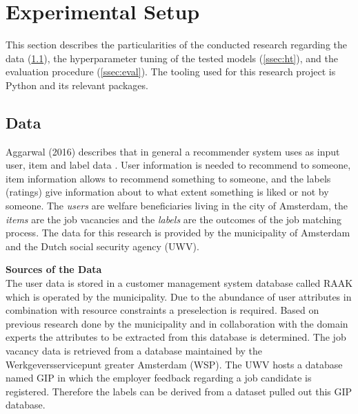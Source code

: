 \section{Experimental Setup}
\label{sec:setup}
This section describes the particularities of the conducted research regarding the data (\ref{ssec:data}), the hyperparameter tuning of the tested models (\ref{ssec:ht}), and the evaluation procedure (\ref{ssec:eval}). 
The tooling used for this research project is Python and its relevant packages.

\subsection{Data}
\label{ssec:data}
Aggarwal (2016) describes that in general a recommender system uses as input user, item and label data \cite{aggarwal2016recommender}.
User information is needed to recommend to someone, item information allows to recommend something to someone, and the labels (ratings) give information about to what extent  something is liked or not by someone.
The \textit{users} are welfare beneficiaries living in the city of Amsterdam, the \textit{items} are the job vacancies and the \textit{labels} are the outcomes of the job matching process.
The data for this research is provided by the municipality of Amsterdam and the Dutch social security agency (UWV).

\noindent
\textbf{Sources of the Data}\\
The user data is stored in a customer management system database called RAAK which is operated by the municipality.
Due to the abundance of user attributes in combination with resource constraints a preselection is required. 
Based on previous research done by the municipality and in collaboration with the domain experts the attributes to be extracted from this database is determined. 
The job vacancy data is retrieved from a database maintained by the Werkgeversservicepunt greater Amsterdam (WSP).
The UWV hosts a database named GIP in which the employer feedback regarding a job candidate is registered.
Therefore the labels can be derived from a dataset pulled out this GIP database.

